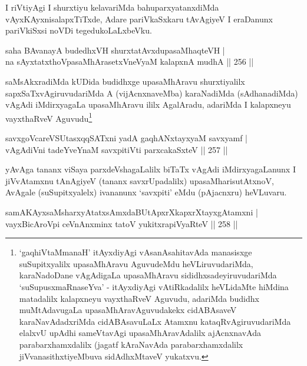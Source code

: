 \begin{artha}
I riVtiyAgi I shurxtiyu kelavariMda bahuparxyatanxdiMda  vAyxKAyxnisalapxTiTxde, Adare pariVkaSxkaru tAvAgiyeV I eraDanunx pariVkiSxsi noVDi tegedukoLaLxbeVku.
\end{artha}


\begin{shl}
saha BAvanayA budedhxVH shurxtatAvxdupasaMhaqteVH |\\
na sAyxtatxthoVpasaMhArasetxVneVyaM kalapxnA mudhA \hfill || 256 ||
\end{shl}

\begin{artha}
saMsAkxradiMda kUDida budidhxge upasaMhAravu shurxtiyalilx  sapxSaTxvAgiruvudariMda A (vijAcnxnaveMba) karaNadiMda (sAdhanadiMda)  vAgAdi iMdirxyagaLa upasaMhAravu ililx AgalAradu, adariMda I kalapxneyu vayxthaRveV Aguvudu\footnote{`gaqhiVtaMmanaH' itAyxdiyAgi vAsanAsahitavAda manasisxge suSupitxyalilx upasaMhAravu AguvudeMdu heVLiruvudariMda, karaNadoDane vAgAdigaLa upasaMhAravu sididhxsadeyiruvudariMda `suSupusxmaRnaseYva' - itAyxdiyAgi vAtiRkadalilx heVLidaMte hiMdina matadalilx kalapxneyu vayxthaRveV Aguvudu, adariMda budidhx muMtAdavugaLa upasaMhAravAguvudakekx cidABAsaveV karaNavAdadxriMda cidABAsavuLaLx Atamxnu kataqRvAgiruvudariMda elalxvU upAdhi sameVtavAgi upasaMhAravAdalilx ajAcnxnavAda parabarxhamxdalilx (jagatf kAraNavAda parabarxhamxdalilx jiVvanasithxtiyeMbuva sidAdhxMtaveV yukatxvu.}
\end{artha}


\begin{shl}
savxgoVcareVSUtasxqqSATxni yadA gaqhANxtayxyaM savxyamf |\\
vAgAdiVni tadeYveYnaM savxpitiVti parxcakaSxteV \hfill || 257 ||
\end{shl}

\begin{artha}
yAvAga tananx viSaya parxdeVshagaLalilx biTaTx vAgAdi iMdirxyagaLanunx  I jiVvAtamxnu tAnAgiyeV (tananx savxrUpadalilx) upasaMharisutAtxnoV, AvAgale (suSupitxyalelx) ivananunx `savxpiti' eMdu (pAjacnxru) heVLuvaru.
\end{artha}


\begin{shl}
samAKAyxsaMsharxyAtatxsAmxdaBUtApxrXkapxrXtayxgAtamxni |\\
vayxBicAroV\s pi ceVnAnxminx tatoV yukitxrapiVyaRteV \hfill || 258 ||
\end{shl}

